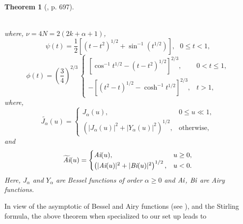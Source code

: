 \documentclass[11pt, reqno]{amsart}
\theoremstyle{plain}
\newtheorem{theorem}{Theorem}[section]
\theoremstyle{remark}
\theoremstyle{example}
\theoremstyle{definition}
\numberwithin{equation}{section}
\begin{document}
\begin{theorem}[\cite{Askey-Wainger}, p. 697]
\begin{enumerate}
\begin{equation}
\begin{split}
        \end{split}
    \end{equation}
\end{enumerate}
where, $\nu = 4N = 2 (2k + \alpha + 1)$,
\begin{equation}
    \psi(t) = \frac{1}{2} \left[ (t- t^2)^{1/2} + \sin^{-1}(t^{1/2}) \right], \ \ \ 0 \leq t <1,
\end{equation}
\begin{equation}
    \phi(t)= \left( \frac{3}{4} \right)^{2/3} \, \begin{cases}
                  \left[ \cos^{-1}{t^{1/2}} - (t - t^{2})^{1/2} \right]^{2/3}, & 0<t\leq 1,\\
                 - \left[ (t^2 - t)^{1/2} - \cosh^{-1} {t^{1/2}} \right]^{2/3},  & t>1,
                \end{cases}
\end{equation}
where,
\begin{equation*}
    \widetilde{J_{\alpha}}(u)= \begin{cases}
                 J_{\alpha}(u), & 0 \leq u \ll  1,\\
                 \left( |J_{\alpha}(u)|^2 + |Y_{\alpha}(u)|^2 \right)^{1/2},  & \text{otherwise},
                \end{cases}
\end{equation*}
and
\begin{equation*}
    \widetilde{ \emph{Ai}  }(u)= \begin{cases}
                 \emph{Ai}(u), & u \geq 0,\\
                 \left( |\emph{Ai}(u)|^2 + |\emph{Bi}(u)|^2 \right)^{1/2},  & u<0.
                \end{cases}
\end{equation*}
Here, $J_{\alpha}$ and $Y_{\alpha}$ are Bessel functions of order $\alpha \geq 0$ and $\emph{Ai}$, $\emph{Bi}$ are Airy functions. 
\end{theorem}
In view of the asymptotic of Bessel and Airy functions (see \cite{Leb72}), and the Stirling formula, the  above theorem when specialized to our set up leads to
\end{document}
